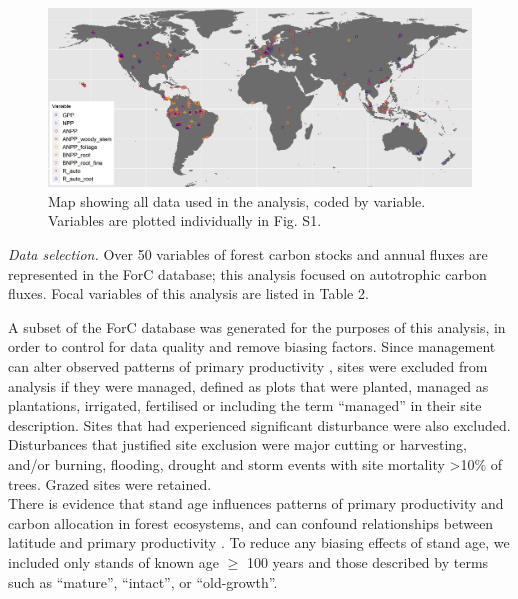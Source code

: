\documentclass[]{article}
\begin{document}
\begin{figure}[H]
\includegraphics[width=1\linewidth]{distribution_all_variables_cropped} \caption{Map showing all data used in the analysis, coded by variable. Variables are plotted individually in Fig. S1. }\label{fig:unnamed-chunk-5}
\end{figure}

\emph{Data selection.} Over 50 variables of forest carbon stocks and
annual fluxes are represented in the ForC database; this analysis
focused on autotrophic carbon fluxes. Focal variables of this analysis
are listed in Table 2.

A subset of the ForC database was generated for the purposes of this
analysis, in order to control for data quality and remove biasing
factors. Since management can alter observed patterns of primary
productivity \citep{simova_enigma_2017}, sites were excluded from
analysis if they were managed, defined as plots that were planted,
managed as plantations, irrigated, fertilised or including the term
``managed'' in their site description. Sites that had experienced
significant disturbance were also excluded. Disturbances that justified
site exclusion were major cutting or harvesting, and/or burning,
flooding, drought and storm events with site mortality
\textgreater{}10\% of trees. Grazed sites were retained.\\
There is evidence that stand age influences patterns of primary
productivity and carbon allocation in forest ecosystems, and can
confound relationships between latitude and primary productivity
\citep{de_lucia_forest_2007, gillman_latitude_2015}. To reduce any
biasing effects of stand age, we included only stands of known age
\(\ge\) 100 years and those described by terms such as ``mature'',
``intact'', or ``old-growth''.

\newpage  
\end{document}
